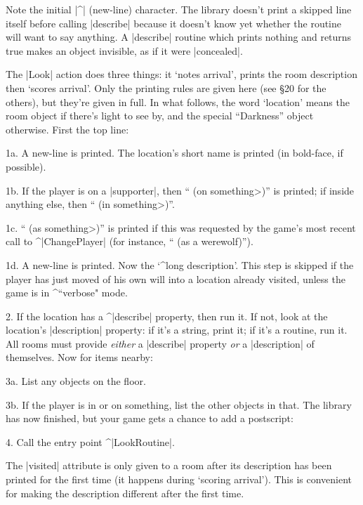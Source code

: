 \danger Note the initial |^| (new-line) character.  The library doesn't print
a skipped line itself before calling |describe| because it doesn't know
yet whether the routine will want to say anything.  A |describe| routine
which prints nothing and returns true makes an object invisible, as if
it were |concealed|.

\bigskip\ninepoint
\ddanger The |Look| action does three things: it `notes arrival', prints
the room description then `scores arrival'.  Only the printing rules are given
here (see \S 20 for the others), but they're given in full.  In what follows,
the word `location' means the room object if there's light to see by,
and the special ``Darkness'' object otherwise.  First the top line:
\item{1a.} A new-line is printed.  The location's short name is printed
(in bold-face, if possible).
\item{1b.} If the player is on a |supporter|, then
`` (on \<something>)'' is printed; if inside anything else, then
`` (in \<something>)''.
\item{1c.} `` (as \<something>)'' is printed if this was requested
by the game's most recent call to ^|ChangePlayer| (for instance,
`` (as a werewolf)'').
\item{1d.} A new-line is printed.
\ninepoint%
Now the `^{long description}'.  This step is skipped if the player has just
moved of his own will into a location already visited, unless the game is
in ^{``verbose"} mode.
\item{2.} If the location has a ^|describe| property, then run it.  If not,
look at the location's |description| property: if it's a string, print it;
if it's a routine, run it.
\ninepoint%
All rooms must provide {\sl either} a |describe| property {\sl or} a
|description| of themselves.  Now for items nearby:
\item{3a.} List any objects on the floor.
\item{3b.} If the player is in or on something, list the other
objects in that.
\ninepoint%
The library has now finished, but your game gets a chance to add a
postscript:
\item{4.} Call the entry point ^|LookRoutine|.

\danger The |visited| attribute is only given to a room after its description
has been printed for the first time (it happens during `scoring arrival').
This is convenient for making the description different after the first time.

